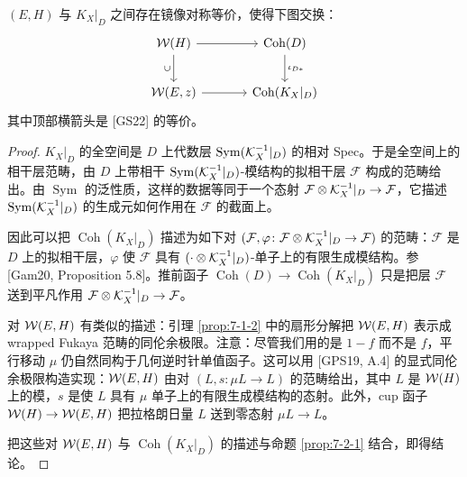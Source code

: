 
\begin{proposition}\label{prop:7-2-2}
$(E,H)$ 与 $K_X|_D$ 之间存在镜像对称等价，使得下图交换：
\[
\begin{tikzcd}[column sep=3.6em, row sep=2.2em]
\cW(H) \arrow[r] \arrow[d, "\cup"'] & \operatorname{Coh}(D) \arrow[d, "\iota_{D*}"] \\
\cW(E,z) \arrow[r] & \operatorname{Coh}(K_X|_D)
\end{tikzcd}
\]
其中顶部横箭头是 [GS22] 的等价。
\end{proposition}

\begin{proof}
$K_X|_D$ 的全空间是 $D$ 上代数层 $\operatorname{Sym}(\mathcal{K}_X^{-1}|_D)$ 的相对 Spec。于是全空间上的相干层范畴，由 $D$ 上带相干 $\operatorname{Sym}(\mathcal{K}_X^{-1}|_D)$-模结构的拟相干层 $\mathcal F$ 构成的范畴给出。由 $\operatorname{Sym}$ 的泛性质，这样的数据等同于一个态射 $\mathcal F\otimes\mathcal{K}_X^{-1}|_D\to\mathcal F$，它描述 $\operatorname{Sym}(\mathcal{K}_X^{-1}|_D)$ 的生成元如何作用在 $\mathcal F$ 的截面上。

因此可以把 $\operatorname{Coh}(K_X|_D)$ 描述为如下对 $(\mathcal F,\varphi\colon\mathcal F\otimes\mathcal{K}_X^{-1}|_D\to\mathcal F)$ 的范畴：$\mathcal F$ 是 $D$ 上的拟相干层，$\varphi$ 使 $\mathcal F$ 具有 $(\cdot\otimes\mathcal{K}_X^{-1}|_D)$-单子上的有限生成模结构。参 [Gam20, Proposition 5.8]。推前函子 $\operatorname{Coh}(D)\to\operatorname{Coh}(K_X|_D)$ 只是把层 $\mathcal F$ 送到平凡作用 $\mathcal F\otimes\mathcal{K}_X^{-1}|_D\to\mathcal F$。


对 $\mathcal{W}(E,H)$ 有类似的描述：引理 \ref{prop:7-1-2} 中的扇形分解把 $\mathcal{W}(E,H)$ 表示成 wrapped Fukaya 范畴的同伦余极限。注意：尽管我们用的是 $1-f$ 而不是 $f$，平行移动 $\mu$ 仍自然同构于几何逆时针单值函子。这可以用 [GPS19, A.4] 的显式同伦余极限构造实现：$\mathcal{W}(E,H)$ 由对 $(L,s\colon\mu L\to L)$ 的范畴给出，其中 $L$ 是 $\mathcal{W}(H)$ 上的模，$s$ 是使 $L$ 具有 $\mu$ 单子上的有限生成模结构的态射。此外，cup 函子 $\mathcal{W}(H)\to\mathcal{W}(E,H)$ 把拉格朗日量 $L$ 送到零态射 $\mu L\to L$。

把这些对 $\mathcal{W}(E,H)$ 与 $\operatorname{Coh}(K_X|_D)$ 的描述与命题 \ref{prop:7-2-1} 结合，即得结论。
\end{proof}

